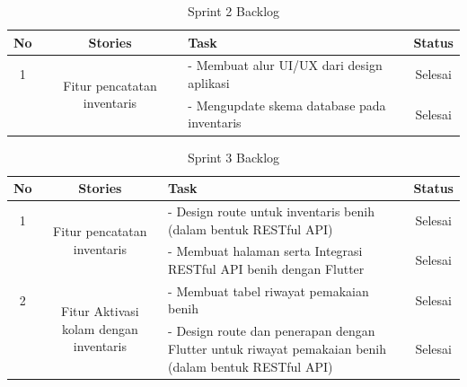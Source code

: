 \begin{spacing}{1.5}
\begin{table}[H]	
	\begin{center}
		\caption{Sprint 2 Backlog}
		\label{tab:table7}
		\begin{tabular}{|c|c|m{13em}|c|}
		\hline
		\textbf{No} & \textbf{Stories} & \textbf{Task} & \textbf{Status} \\
		\hline
		1 & \multirow{2}{12em}{Fitur pencatatan inventaris} & - Membuat alur UI/UX dari design aplikasi & Selesai \\
		&  & - Mengupdate skema database pada inventaris & Selesai \\ 
		\hline
		\end{tabular}
	\end{center}
\end{table}

\begin{table}[H]	
	\begin{center}
		\caption{Sprint 3 Backlog}
		\label{tab:table20}
		\begin{tabular}{|c|c|m{13em}|c|}
		\hline
		\textbf{No} & \textbf{Stories} & \textbf{Task} & \textbf{Status} \\
		\hline
		1 & \multirow{2}{12em}{Fitur pencatatan inventaris} & - Design route untuk inventaris benih (dalam bentuk RESTful API) & Selesai \\
		&  & - Membuat halaman serta Integrasi RESTful API benih dengan Flutter & Selesai \\ 
		\hline
		2 & \multirow{2}{12em}{Fitur Aktivasi kolam dengan inventaris} & - Membuat tabel riwayat pemakaian benih & Selesai \\
		&  & - Design route dan penerapan dengan Flutter untuk riwayat pemakaian benih (dalam bentuk RESTful API) & Selesai \\ 
		\hline
		\end{tabular}
	\end{center}
\end{table}


\end{spacing}
